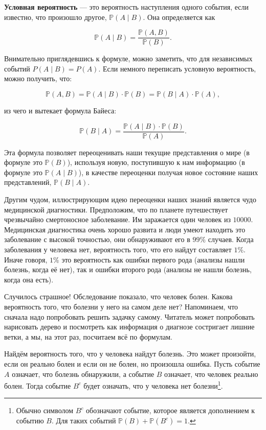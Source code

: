 \documentclass[12pt, a4paper, oneside]{extreport}
\def \mbb{\mathbb}
\def \PP{\mbb{P}}
\newcommand{\indef}[1]{\textbf{#1}}     %
\theoremstyle{plain}              %
\theoremstyle{definition}         %
\begin{document}
\indef{Условная вероятность} --- это вероятность наступления одного события, если известно, что произошло другое, $\PP(A \mid B)$.  Она определяется как

\[ \PP(A \mid B) = \frac{\PP(A, B)}{\PP(B)}.\]

Внимательно приглядевшись к формуле, можно заметить, что для независимых событий $P(A \mid B) = P(A).$  Если немного переписать условную вероятность, можно получить, что: 

\[ \PP(A, B) = \PP(A \mid B) \cdot \PP(B) = \PP(B \mid A) \cdot \PP(A), \] 

из чего и вытекает формула Байеса:

\[ \PP(B  \mid A) = \frac{\PP(A \mid B) \cdot \PP(B)}{\PP(A)}.\]

Эта формула позволяет переоценивать наши текущие представления о мире (в формуле это $\PP(B)$), используя новую, поступившую к нам информацию (в формуле это $\PP(A \mid B)$), в качестве переоценки получая новое состояние наших представлений, $\PP(B \mid A)$.  

Другим чудом, иллюстрирующим идею переоценки наших знаний является чудо медицинской диагностики.  Предположим, что по планете путешествует чрезвычайно смертоносное заболевание. Им заражается один человек из $10 000$.  Медицинская диагностика очень хорошо развита и люди умеют находить это заболевание с высокой точностью, они обнаруживают его в $99\%$ случаев. Когда заболевания у человека нет, вероятность того, что его найдут составляет $1\%$.  Иначе говоря, $1\%$ это вероятность как ошибки первого рода (анализы нашли болезнь, когда её нет), так и ошибки второго рода (анализы не нашли болезнь, когда она есть). 

Случилось страшное! Обследование показало, что человек болен. Какова вероятность того, что болезни у него на самом деле нет? Напоминаем, что сначала надо попробовать решить задачку самому. Читатель может попробовать нарисовать дерево и посмотреть как информация о диагнозе состригает лишние ветки, а мы, на этот раз, посчитаем всё по формулам.

Найдём вероятность того, что у человека найдут болезнь. Это может произойти, если он реально болен и если он не болен, но произошла ошибка.  Пусть событие $A$ означает, что болезнь обнаружили, а событие $B$ означает, что человек реально болен.  Тогда событие $B^{c}$ будет означать, что у человека нет болезни\footnote{Обычно символом $B^c$ обозначают событие, которое является дополнением к событию $B$. Для таких событий $\PP(B) + \PP(B^c) = 1$.}. 
\end{document}
